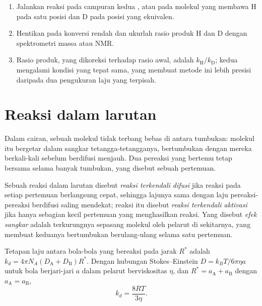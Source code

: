 \begin{method}\label{met:b3:rate-theories:kie}
\begin{enumerate}
  \item Jalankan reaksi pada campuran kedua , atau pada molekul yang
        membawa H pada satu posisi dan D pada posisi yang ekuivalen.
  \item Hentikan pada konversi rendah dan ukurlah rasio produk H dan D dengan
        spektrometri massa atau NMR.
  \item Rasio produk, yang dikoreksi terhadap rasio awal, adalah
        $k_{\mathrm H}/k_{\mathrm D}$; kedua  mengalami kondisi yang tepat sama,
        yang membuat metode ini lebih presisi daripada dua pengukuran laju yang
        terpisah.
\end{enumerate}
\end{method}

\section{Reaksi dalam larutan}

Dalam cairan, sebuah molekul tidak terbang bebas di antara tumbukan: molekul
itu bergetar dalam sangkar tetangga-tetangganya, bertumbukan dengan mereka
berkali-kali sebelum berdifusi menjauh. Dua pereaksi yang bertemu tetap
bersama selama banyak tumbukan, yang disebut sebuah pertemuan.

\begin{definition}\label{def:b3:rate-theories:diffusion}
Sebuah reaksi dalam larutan disebut \emph{reaksi terkendali
difusi} jika reaksi pada setiap pertemuan berlangsung cepat,
sehingga lajunya sama dengan laju pereaksi-pereaksi berdifusi saling mendekat;
reaksi itu disebut \emph{reaksi terkendali
aktivasi} jika hanya sebagian kecil pertemuan yang menghasilkan reaksi. Yang
disebut \emph{efek sangkar} adalah terkurungnya sepasang
molekul oleh pelarut di sekitarnya, yang membuat keduanya bertumbukan
berulang-ulang selama satu pertemuan.
\end{definition}

\begin{proposition}\label{prop:b3:rate-theories:smoluchowski}
Tetapan laju  antara bola-bola yang bereaksi pada
jarak $R^*$ adalah $k_d = 4\pi N_A(D_{\mathrm A} + D_{\mathrm B})R^*$. Dengan hubungan
Stokes--Einstein $D = k_BT/6\pi\eta a$ untuk bola berjari-jari $a$ dalam
pelarut berviskositas $\eta$, dan $R^* = a_{\mathrm A} + a_{\mathrm B}$ dengan
$a_{\mathrm A} = a_{\mathrm B}$,
\[
  k_d = \frac{8RT}{3\eta} .
\]
\end{proposition}

